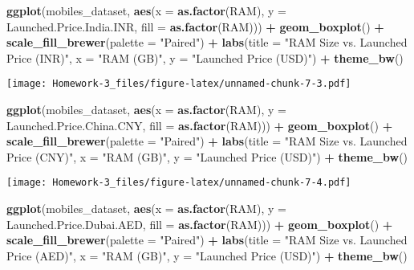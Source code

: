 \documentclass[
]{article}
\newenvironment{Shaded}{\begin{snugshade}}{\end{snugshade}}
\newcommand{\AttributeTok}[1]{\textcolor[rgb]{0.13,0.29,0.53}{#1}}
\newcommand{\FunctionTok}[1]{\textcolor[rgb]{0.13,0.29,0.53}{\textbf{#1}}}
\newcommand{\NormalTok}[1]{#1}
\newcommand{\SpecialCharTok}[1]{\textcolor[rgb]{0.81,0.36,0.00}{\textbf{#1}}}
\newcommand{\StringTok}[1]{\textcolor[rgb]{0.31,0.60,0.02}{#1}}
\begin{document}
\begin{Shaded}
\begin{Highlighting}[]
\FunctionTok{ggplot}\NormalTok{(mobiles\_dataset, }\FunctionTok{aes}\NormalTok{(}\AttributeTok{x =} \FunctionTok{as.factor}\NormalTok{(RAM), }\AttributeTok{y =}\NormalTok{ Launched.Price.India.INR, }\AttributeTok{fill =} \FunctionTok{as.factor}\NormalTok{(RAM))) }\SpecialCharTok{+}
  \FunctionTok{geom\_boxplot}\NormalTok{() }\SpecialCharTok{+}
  \FunctionTok{scale\_fill\_brewer}\NormalTok{(}\AttributeTok{palette =} \StringTok{"Paired"}\NormalTok{) }\SpecialCharTok{+}
  \FunctionTok{labs}\NormalTok{(}\AttributeTok{title =} \StringTok{"RAM Size vs. Launched Price (INR)"}\NormalTok{,}
       \AttributeTok{x =} \StringTok{"RAM (GB)"}\NormalTok{,}
       \AttributeTok{y =} \StringTok{"Launched Price (USD)"}\NormalTok{) }\SpecialCharTok{+}  
  \FunctionTok{theme\_bw}\NormalTok{()}
\end{Highlighting}
\end{Shaded}

\texttt{[image: Homework-3\_files/figure-latex/unnamed-chunk-7-3.pdf]}

\begin{Shaded}
\begin{Highlighting}[]
\FunctionTok{ggplot}\NormalTok{(mobiles\_dataset, }\FunctionTok{aes}\NormalTok{(}\AttributeTok{x =} \FunctionTok{as.factor}\NormalTok{(RAM), }\AttributeTok{y =}\NormalTok{ Launched.Price.China.CNY, }\AttributeTok{fill =} \FunctionTok{as.factor}\NormalTok{(RAM))) }\SpecialCharTok{+}
  \FunctionTok{geom\_boxplot}\NormalTok{() }\SpecialCharTok{+}
  \FunctionTok{scale\_fill\_brewer}\NormalTok{(}\AttributeTok{palette =} \StringTok{"Paired"}\NormalTok{) }\SpecialCharTok{+}  
  \FunctionTok{labs}\NormalTok{(}\AttributeTok{title =} \StringTok{"RAM Size vs. Launched Price (CNY)"}\NormalTok{,}
       \AttributeTok{x =} \StringTok{"RAM (GB)"}\NormalTok{,}
       \AttributeTok{y =} \StringTok{"Launched Price (USD)"}\NormalTok{) }\SpecialCharTok{+} 
  \FunctionTok{theme\_bw}\NormalTok{()}
\end{Highlighting}
\end{Shaded}

\texttt{[image: Homework-3\_files/figure-latex/unnamed-chunk-7-4.pdf]}

\begin{Shaded}
\begin{Highlighting}[]
\FunctionTok{ggplot}\NormalTok{(mobiles\_dataset, }\FunctionTok{aes}\NormalTok{(}\AttributeTok{x =} \FunctionTok{as.factor}\NormalTok{(RAM), }\AttributeTok{y =}\NormalTok{ Launched.Price.Dubai.AED, }\AttributeTok{fill =} \FunctionTok{as.factor}\NormalTok{(RAM))) }\SpecialCharTok{+}
  \FunctionTok{geom\_boxplot}\NormalTok{() }\SpecialCharTok{+}
  \FunctionTok{scale\_fill\_brewer}\NormalTok{(}\AttributeTok{palette =} \StringTok{"Paired"}\NormalTok{) }\SpecialCharTok{+}  
  \FunctionTok{labs}\NormalTok{(}\AttributeTok{title =} \StringTok{"RAM Size vs. Launched Price (AED)"}\NormalTok{,}
       \AttributeTok{x =} \StringTok{"RAM (GB)"}\NormalTok{,}
       \AttributeTok{y =} \StringTok{"Launched Price (USD)"}\NormalTok{) }\SpecialCharTok{+}
  \FunctionTok{theme\_bw}\NormalTok{()}
\end{Highlighting}
\end{Shaded}
\end{document}
